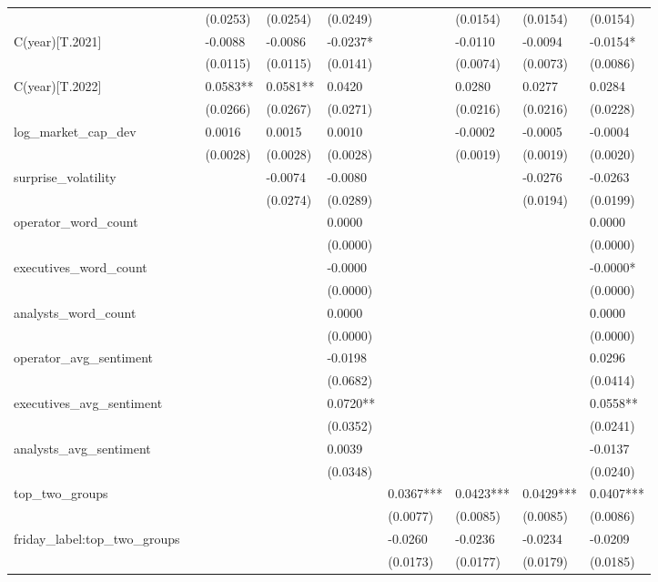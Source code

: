 \begin{tabular}{lllllllll}
 &  & (0.0253) & (0.0254) & (0.0249) &  & (0.0154) & (0.0154) & (0.0154) \\
C(year)[T.2021] &  & -0.0088 & -0.0086 & -0.0237* &  & -0.0110 & -0.0094 & -0.0154* \\
 &  & (0.0115) & (0.0115) & (0.0141) &  & (0.0074) & (0.0073) & (0.0086) \\
C(year)[T.2022] &  & 0.0583** & 0.0581** & 0.0420 &  & 0.0280 & 0.0277 & 0.0284 \\
 &  & (0.0266) & (0.0267) & (0.0271) &  & (0.0216) & (0.0216) & (0.0228) \\
log_market_cap_dev &  & 0.0016 & 0.0015 & 0.0010 &  & -0.0002 & -0.0005 & -0.0004 \\
 &  & (0.0028) & (0.0028) & (0.0028) &  & (0.0019) & (0.0019) & (0.0020) \\
surprise_volatility &  &  & -0.0074 & -0.0080 &  &  & -0.0276 & -0.0263 \\
 &  &  & (0.0274) & (0.0289) &  &  & (0.0194) & (0.0199) \\
operator_word_count &  &  &  & 0.0000 &  &  &  & 0.0000 \\
 &  &  &  & (0.0000) &  &  &  & (0.0000) \\
executives_word_count &  &  &  & -0.0000 &  &  &  & -0.0000* \\
 &  &  &  & (0.0000) &  &  &  & (0.0000) \\
analysts_word_count &  &  &  & 0.0000 &  &  &  & 0.0000 \\
 &  &  &  & (0.0000) &  &  &  & (0.0000) \\
operator_avg_sentiment &  &  &  & -0.0198 &  &  &  & 0.0296 \\
 &  &  &  & (0.0682) &  &  &  & (0.0414) \\
executives_avg_sentiment &  &  &  & 0.0720** &  &  &  & 0.0558** \\
 &  &  &  & (0.0352) &  &  &  & (0.0241) \\
analysts_avg_sentiment &  &  &  & 0.0039 &  &  &  & -0.0137 \\
 &  &  &  & (0.0348) &  &  &  & (0.0240) \\
top_two_groups &  &  &  &  & 0.0367*** & 0.0423*** & 0.0429*** & 0.0407*** \\
 &  &  &  &  & (0.0077) & (0.0085) & (0.0085) & (0.0086) \\
friday_label:top_two_groups &  &  &  &  & -0.0260 & -0.0236 & -0.0234 & -0.0209 \\
 &  &  &  &  & (0.0173) & (0.0177) & (0.0179) & (0.0185) \\

\end{tabular}
